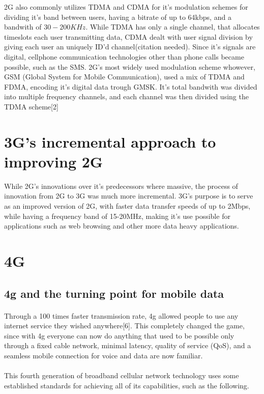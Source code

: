 \documentclass[10pt,journal,compsoc]{IEEEtran}
\begin{document}
2G also commonly utilizes TDMA and CDMA for it's modulation schemes for dividing it's band between users, having a bitrate of up to 64kbps, and a bandwith of $30-200KHz$. While TDMA has only a single channel, that allocates timeslots each user transmitting data, CDMA dealt with user signal division by giving each user an uniquely ID'd channel(citation needed). Since it's signals are digital, cellphone communication technologies other than phone calls became possible, such as the SMS. 2G's most widely used modulation scheme whowever, GSM (Global System for Mobile Communication), used a mix of TDMA and FDMA, encoding it's digital data trough GMSK. It's total bandwith was divided into multiple frequency channels, and each channel was then divided using the TDMA scheme[2]

\section{3G's incremental approach to improving 2G}
While 2G's innovations over it's predecessors where massive, the process of innovation from 2G to 3G was much more incremental. 3G's purpose is to serve as an improved version of 2G, with faster data transfer speeds of up to 2Mbps, while having a frequency band of 15-20MHz, making it's use possible for applications such as web browsing and other more data heavy applications.

\section{4G}

\subsection*{4g and the turning point for mobile data}
\paragraph{}
Through a 100 times faster transmission rate, 4g allowed people to use any internet service they wished anywhere[6]. This completely changed the game, since with 4g everyone can now do anything that used to be possible only through a fixed cable network, minimal latency, quality of service (QoS), and a seamless mobile connection for voice and data are now familiar.
\paragraph{}
This fourth generation of broadband cellular network technology uses some established standards for achieving all of its capabilities, such as the following. 
\end{document}
